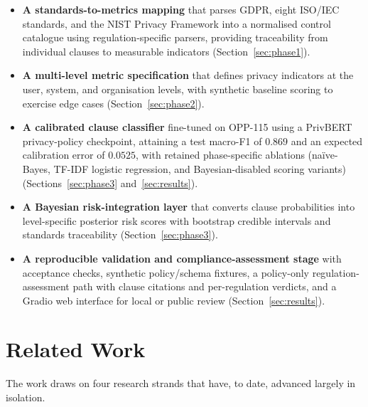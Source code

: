 \documentclass[conference]{IEEEtran}
\begin{document}
\begin{itemize}
  \item \textbf{A standards-to-metrics mapping} that parses GDPR, eight
  ISO/IEC standards, and the NIST Privacy Framework into a normalised
  control catalogue using regulation-specific parsers, providing
  traceability from individual clauses to measurable indicators
  (Section~\ref{sec:phase1}).
  \item \textbf{A multi-level metric specification} that defines privacy
  indicators at the user, system, and organisation levels, with synthetic
  baseline scoring to exercise edge cases (Section~\ref{sec:phase2}).
  \item \textbf{A calibrated clause classifier} fine-tuned on OPP-115 using
  a PrivBERT privacy-policy checkpoint, attaining a test macro-F1 of $0.869$
  and an expected calibration error of $0.0525$, with retained
  phase-specific ablations (na\"ive-Bayes, TF-IDF logistic regression,
  and Bayesian-disabled scoring variants)
  (Sections~\ref{sec:phase3} and~\ref{sec:results}).
  \item \textbf{A Bayesian risk-integration layer} that converts clause
  probabilities into level-specific posterior risk scores with bootstrap
  credible intervals and standards traceability
  (Section~\ref{sec:phase3}).
  \item \textbf{A reproducible validation and compliance-assessment stage}
  with acceptance checks, synthetic policy/schema fixtures, a policy-only
  regulation-assessment path with clause citations and per-regulation verdicts,
  and a Gradio web interface for local or public review
  (Section~\ref{sec:results}).
\end{itemize}

\section{Related Work}\label{sec:related}
The work draws on four research strands that have, to date, advanced largely
in isolation.
\end{document}

